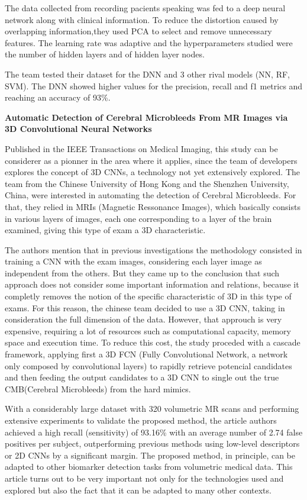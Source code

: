 \documentclass[10pt]{IEEEtran}
\begin{document}
The data collected from recording pacients speaking was fed to a deep neural network along with clinical information. 
To reduce the distortion caused by overlapping information,they used PCA to select and remove unnecessary features.
The learning rate was adaptive and the hyperparameters studied were the number of hidden layers and of hidden layer nodes. 

The team tested their dataset for the DNN and 3 other rival models (NN, RF, SVM). The DNN showed higher values for the precision, recall and f1 metrics and reaching an accuracy of 93\%.

\textbf{Automatic Detection of Cerebral Microbleeds From MR Images via 3D Convolutional Neural Networks}

Published in the IEEE Transactions on Medical Imaging, this study can be considerer as a pionner in the area where it applies, since the team of developers explores the concept of 3D CNNs, a technology not yet extensively explored.
The team from the Chinese University of Hong Kong and the Shenzhen University, China, were interested in automating the detection of Cerebral Microbleeds.
 For that, they relied in MRIs (Magnetic Ressonance Images), which basically consists in various layers of images, each one corresponding to a layer of the brain examined, giving this type of exam a 3D characteristic.

The authors mention that in previous investigations the methodology consisted in training a CNN with the exam images, considering each layer image as independent from the others. 
But they came up to the conclusion that such approach does not consider some important information and relations, because it completly removes the notion of the specific characteristic of 3D in this type of exams. 
For this reason, the chinese team decided to use a 3D CNN, taking in consideration the full dimension of the data. 
However, that approuch is very expensive, requiring a lot of resources such as computational capacity, memory space and execution time. 
To reduce this cost, the study proceded with a cascade framework, applying first a 3D FCN (Fully Convolutional Network, a network only composed by convolutional layers) to rapidly retrieve potencial candidates and then feeding the output candidates to a 3D CNN to single out the true CMB(Cerebral Microbleeds) from the hard mimics.

With a considerably large dataset with 320 volumetric MR scans and performing extensive experiments to validate the proposed method, the article authors achieved a high recall (sensitivity) of 93.16\% with an average number of 2.74 false positives per subject, outperforming previous methods using low-level descriptors or 2D CNNs by a significant margin. 
The proposed method, in principle, can be adapted to other biomarker detection tasks from volumetric medical data. 
This article turns out to be very important not only for the technologies used and explored but also the fact that it can be adapted to many other contexts. 
\end{document}
